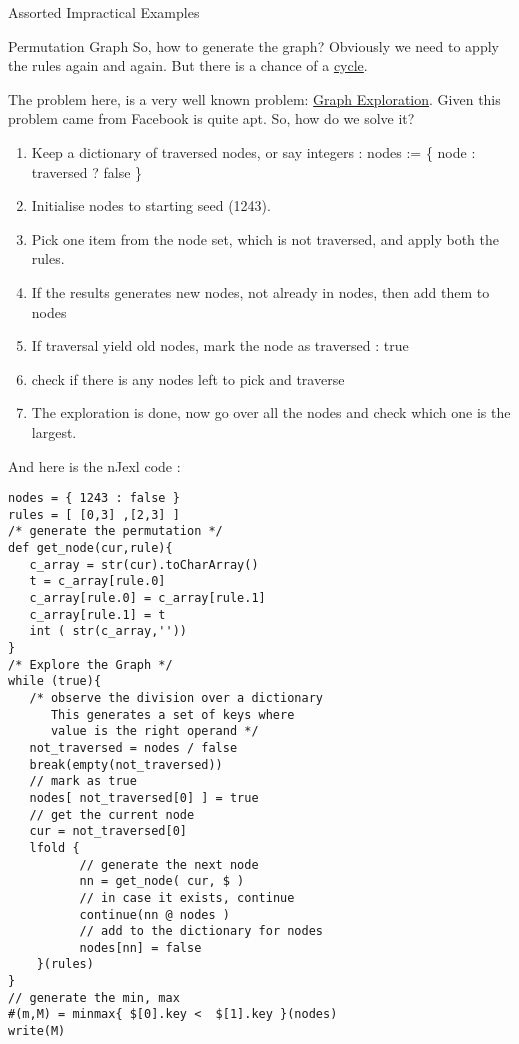 \begin{section}{Assorted Impractical Examples}
\begin{subsection}{Permutation Graph}
So, how to generate the graph? Obviously we need to apply the rules again and again.
But there is a chance of a \href{https://en.wikipedia.org/wiki/Cycle\_(graph_theory)}{cycle}.

The problem here, is a very well known problem: 
\href{https://en.wikipedia.org/wiki/Graph\_traversal\#Graph\_exploration}{Graph Exploration}.
Given this problem came from Facebook is quite apt. So, how do we solve it?

\begin{enumerate}
\item{Keep a dictionary of traversed nodes, or say integers : nodes := \{ node : traversed ? false \}  }
\item{Initialise nodes to starting seed (1243). }
\item{Pick one item from the node set, which is not traversed, and apply both the rules. }
\item{If the results generates new nodes, not already in nodes, then add them to nodes }
\item{If traversal yield old nodes, mark the node as traversed : true }
\item{check if there is any nodes left to pick and traverse}
\item{The exploration is done, now go over all the nodes and check which one is the largest. }
\end{enumerate}

And here is the nJexl code :
\begin{center}\begin{minipage}{\linewidth}
\begin{lstlisting}[style=JexlStyle]
nodes = { 1243 : false }
rules = [ [0,3] ,[2,3] ] 
/* generate the permutation */
def get_node(cur,rule){
   c_array = str(cur).toCharArray()
   t = c_array[rule.0]
   c_array[rule.0] = c_array[rule.1]
   c_array[rule.1] = t 
   int ( str(c_array,'')) 
}
/* Explore the Graph */
while (true){
   /* observe the division over a dictionary 
      This generates a set of keys where 
      value is the right operand */
   not_traversed = nodes / false 
   break(empty(not_traversed)) 
   // mark as true 
   nodes[ not_traversed[0] ] = true
   // get the current node 
   cur = not_traversed[0] 
   lfold {
          // generate the next node 
          nn = get_node( cur, $ )
          // in case it exists, continue 
          continue(nn @ nodes )
          // add to the dictionary for nodes 
          nodes[nn] = false 
    }(rules)
}
// generate the min, max 
#(m,M) = minmax{ $[0].key <  $[1].key }(nodes)
write(M)
\end{lstlisting}  
\end{minipage}\end{center}
\end{subsection}


\end{section}
